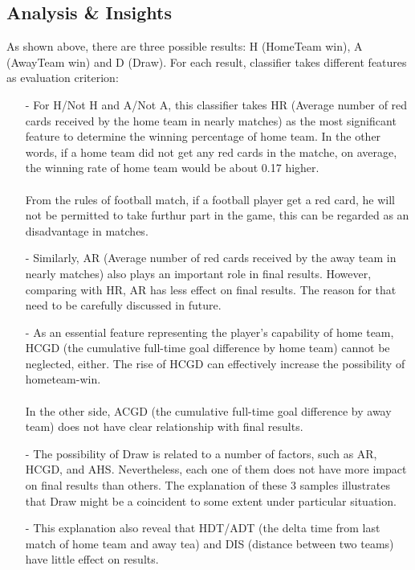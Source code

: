 \documentclass{article}
\begin{document}
\subsection{Analysis \& Insights}
As shown above, there are three possible results: H (HomeTeam win), A (AwayTeam win) and D (Draw). For each result, classifier takes different features as  evaluation criterion:
\begin{itemize}
\item[-] For H/Not H and A/Not A, this classifier takes HR (Average number of red cards received by the home team in nearly matches) as the most significant feature to determine the winning percentage of home team. In the other words, if a home team did not get any red cards in the matche, on average, the winning rate of home team would be about 0.17 higher. \\
~\\
From the rules of football match, if a football player get a red card, he will not be permitted to take furthur part in the game, this can be regarded as an disadvantage in matches.\\

\item[-] Similarly, AR (Average number of red cards received by the away team in nearly matches) also plays an important role in final results. However, comparing with HR, AR has less effect on final results. The reason for that need to be carefully discussed in future. 
\\

\item[-] As an essential feature representing the player's capability of home team, HCGD (the cumulative full-time goal difference by home team) cannot be neglected, either. The rise of HCGD can effectively increase the possibility of hometeam-win.\\
~\\
In the other side, ACGD (the cumulative full-time goal difference by away team) does not have clear relationship with final results.
\\

\item[-] The possibility of Draw is related to a number of factors, such as AR, HCGD, and AHS. Nevertheless, each one of them does not have more impact on final results than others. The explanation of these 3 samples illustrates that Draw might be a coincident to some extent under particular situation.
\\

\item[-] This explanation also reveal that HDT/ADT (the delta time from last match of home team and away tea) and DIS (distance between two teams) have little effect on results. 
\\

\end{itemize}
\end{document}
